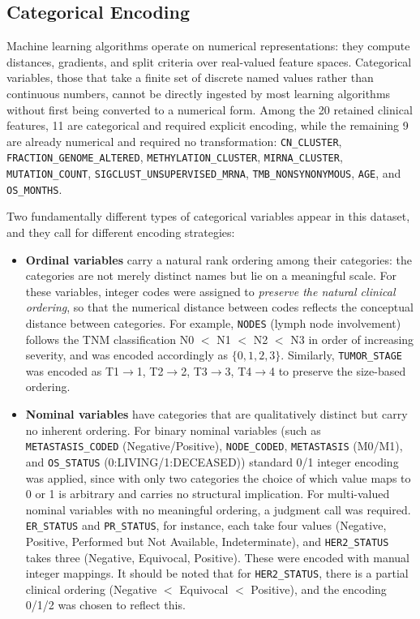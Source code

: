 \subsection{Categorical Encoding}
\label{subsec:encoding}
Machine learning algorithms operate on numerical representations: they compute
distances, gradients, and split criteria over real-valued feature spaces.
Categorical variables, those that take a finite set of discrete named
values rather than continuous numbers, cannot be directly ingested by most
learning algorithms without first being converted to a numerical form. Among
the 20 retained clinical features, 11 are categorical and required explicit
encoding, while the remaining 9 are already numerical and required no
transformation: \texttt{CN\_CLUSTER}, \texttt{FRACTION\_GENOME\_ALTERED},
\texttt{METHYLATION\_CLUSTER}, \texttt{MIRNA\_CLUSTER},
\texttt{MUTATION\_COUNT}, \texttt{SIGCLUST\_UNSUPERVISED\_MRNA},
\texttt{TMB\_NONSYNONYMOUS}, \texttt{AGE}, and \texttt{OS\_MONTHS}.

Two fundamentally different types of categorical variables appear in this
dataset, and they call for different encoding strategies:
\begin{itemize}
    \item \textbf{Ordinal variables} carry a natural rank ordering among their
        categories: the categories are not merely distinct names but lie on a
        meaningful scale. For these variables, integer codes were assigned to
        \textit{preserve the natural clinical ordering}, so that the numerical
        distance between codes reflects the conceptual distance between categories.
        For example, \texttt{NODES} (lymph node involvement) follows the TNM
        classification N0 $<$ N1 $<$ N2 $<$ N3 in order of increasing severity, and
        was encoded accordingly as $\{0, 1, 2, 3\}$. Similarly, \texttt{TUMOR\_STAGE}
        was encoded as T1$\to$1, T2$\to$2, T3$\to$3, T4$\to$4 to preserve the
        size-based ordering.
    \item \textbf{Nominal variables} have categories that are qualitatively distinct but
        carry no inherent ordering. For binary nominal variables (such as
        \texttt{METASTASIS\_CODED} (Negative/Positive), \texttt{NODE\_CODED},
        \texttt{METASTASIS} (M0/M1), and \texttt{OS\_STATUS} (0:LIVING/1:DECEASED))
        standard 0/1 integer encoding was applied, since with only two categories
        the choice of which value maps to 0 or 1 is arbitrary and carries no
        structural implication. For multi-valued nominal variables with no meaningful
        ordering, a judgment call was required. \texttt{ER\_STATUS} and
        \texttt{PR\_STATUS}, for instance, each take four values
        (Negative, Positive, Performed but Not Available, Indeterminate), and
        \texttt{HER2\_STATUS} takes three (Negative, Equivocal, Positive). These were
        encoded with manual integer mappings. It should be noted that for
        \texttt{HER2\_STATUS}, there is a partial clinical ordering
        (Negative $<$ Equivocal $<$ Positive), and the encoding 0/1/2 was chosen to
        reflect this.
\end{itemize}

